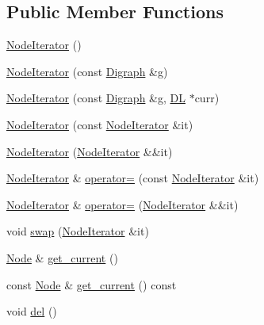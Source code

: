 \subsection*{Public Member Functions}
\begin{DoxyCompactItemize}
\item 
\hyperlink{class_designar_1_1_digraph_1_1_node_iterator_a53d6530188cf6c4ed6d2b2b114af9967}{Node\+Iterator} ()
\item 
\hyperlink{class_designar_1_1_digraph_1_1_node_iterator_aa54e560d151fad3a8e36c91dc4006ce4}{Node\+Iterator} (const \hyperlink{class_designar_1_1_digraph}{Digraph} \&g)
\item 
\hyperlink{class_designar_1_1_digraph_1_1_node_iterator_a2a8d16402a7ec8ac1675cb2729bc4726}{Node\+Iterator} (const \hyperlink{class_designar_1_1_digraph}{Digraph} \&g, \hyperlink{class_designar_1_1_d_l}{DL} $\ast$curr)
\item 
\hyperlink{class_designar_1_1_digraph_1_1_node_iterator_a44f61f9d3101b8d44d864448d5b7c73a}{Node\+Iterator} (const \hyperlink{class_designar_1_1_digraph_1_1_node_iterator}{Node\+Iterator} \&it)
\item 
\hyperlink{class_designar_1_1_digraph_1_1_node_iterator_a36ab758f25d1e498d743dee93cb9a013}{Node\+Iterator} (\hyperlink{class_designar_1_1_digraph_1_1_node_iterator}{Node\+Iterator} \&\&it)
\item 
\hyperlink{class_designar_1_1_digraph_1_1_node_iterator}{Node\+Iterator} \& \hyperlink{class_designar_1_1_digraph_1_1_node_iterator_a5a3b469e7e11a1edc675b50c32675282}{operator=} (const \hyperlink{class_designar_1_1_digraph_1_1_node_iterator}{Node\+Iterator} \&it)
\item 
\hyperlink{class_designar_1_1_digraph_1_1_node_iterator}{Node\+Iterator} \& \hyperlink{class_designar_1_1_digraph_1_1_node_iterator_a5e7f1b52084070e0129b0ac21e01ece9}{operator=} (\hyperlink{class_designar_1_1_digraph_1_1_node_iterator}{Node\+Iterator} \&\&it)
\item 
void \hyperlink{class_designar_1_1_digraph_1_1_node_iterator_a12cabc8c33105f26a202acf90b0f49ab}{swap} (\hyperlink{class_designar_1_1_digraph_1_1_node_iterator}{Node\+Iterator} \&it)
\item 
\hyperlink{class_designar_1_1_digraph_a4dc921c41a480b7946a04170e997d8ae}{Node} \& \hyperlink{class_designar_1_1_digraph_1_1_node_iterator_a2d9961869a4ec52a112354600094646c}{get\+\_\+current} ()
\item 
const \hyperlink{class_designar_1_1_digraph_a4dc921c41a480b7946a04170e997d8ae}{Node} \& \hyperlink{class_designar_1_1_digraph_1_1_node_iterator_a99f4eef333d432b662710b2868761d35}{get\+\_\+current} () const
\item 
void \hyperlink{class_designar_1_1_digraph_1_1_node_iterator_a8d68d82384631f601055ef9b742b0dbf}{del} ()
\end{DoxyCompactItemize}
